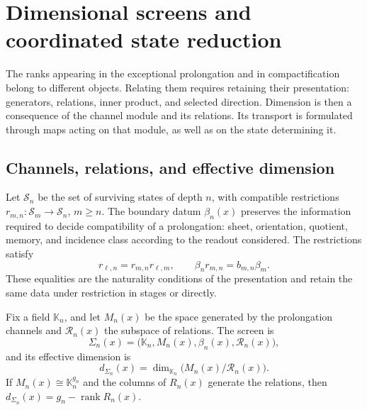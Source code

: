 \section{Dimensional screens and coordinated state reduction}
\label{iv:pantallas}
\begingroup
\setlength{\parskip}{2pt plus 1pt minus .5pt}
\setlength{\abovedisplayskip}{6pt plus 1pt minus 1pt}
\setlength{\belowdisplayskip}{6pt plus 1pt minus 1pt}
\setlength{\abovedisplayshortskip}{2pt plus 1pt}
\setlength{\belowdisplayshortskip}{4pt plus 1pt minus 1pt}

The ranks appearing in the exceptional prolongation and in
compactification belong to different objects. Relating them
requires retaining their presentation: generators, relations, inner
product, and selected direction. Dimension is then a
consequence of the channel module and its relations. Its
transport is formulated through maps acting on that module,
as well as on the state determining it.

\subsection{Channels, relations, and effective dimension}

Let \(\mathcal S_n\) be the set of surviving states of
depth \(n\), with compatible restrictions
\(r_{m,n}:\mathcal S_m\to\mathcal S_n\), \(m\geq n\).
The boundary datum \(\beta_n(x)\) preserves the information
required to decide compatibility of a prolongation:
sheet, orientation, quotient, memory, and incidence class according to
the readout considered. The restrictions satisfy
\[
 r_{\ell,n}=r_{m,n}r_{\ell,m},\qquad
 \beta_n r_{m,n}=b_{m,n}\beta_m.
\]
These equalities are the naturality conditions of the
presentation and retain the same data under restriction
in stages or directly.

\begin{definition}
\label{iv:def:pantalla}
Fix a field \(\mathbb K_n\), and let \(M_n(x)\) be the space
generated by the prolongation channels and \(\mathcal R_n(x)\)
the subspace of relations. The screen is
\[
 \Sigma_n(x)=\bigl(\mathbb K_n,M_n(x),\beta_n(x),
                    \mathcal R_n(x)\bigr),
\]
and its effective dimension is
\begin{equation}
 d_{\Sigma_n}(x)=\dim_{\mathbb K_n}
                    \bigl(M_n(x)/\mathcal R_n(x)\bigr).
 \label{iv:eq:dimension-pantalla}
\end{equation}
If \(M_n(x)\cong\mathbb K_n^{g_n}\) and the columns of
\(R_n(x)\) generate the relations, then
\(d_{\Sigma_n}(x)=g_n-\operatorname{rank}R_n(x)\).
\end{definition}

